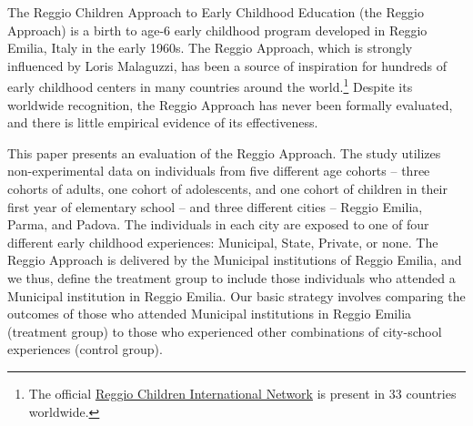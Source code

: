 The Reggio Children Approach to Early Childhood Education (the Reggio Approach) is a birth to age-6 early childhood program developed in Reggio Emilia, Italy  in the early 1960s. The Reggio Approach, which is strongly influenced by Loris Malaguzzi, has been a source of inspiration for hundreds of early childhood centers in many countries around the world.\footnote{The official \href{http://www.reggiochildren.it/network/?lang=en}{Reggio Children International Network} is present in 33 countries worldwide.} Despite its worldwide recognition, the Reggio Approach has never been formally evaluated, and there is little empirical evidence of its effectiveness. 

This paper presents an evaluation of the Reggio Approach. The study utilizes non-experimental data on individuals from five different age cohorts -- three cohorts of adults, one cohort of adolescents, and one cohort of children in their first year of elementary school -- and three different cities -- Reggio Emilia, Parma, and Padova. The individuals in each city are exposed to one of four different early childhood experiences: Municipal, State, Private, or none. The Reggio Approach is delivered by the Municipal institutions of Reggio Emilia, and we thus, define the treatment group to include those individuals who attended a Municipal institution in Reggio Emilia. Our basic strategy involves comparing the outcomes of those who attended Municipal institutions in Reggio Emilia (treatment group) to those who experienced other combinations of city-school experiences (control group).

